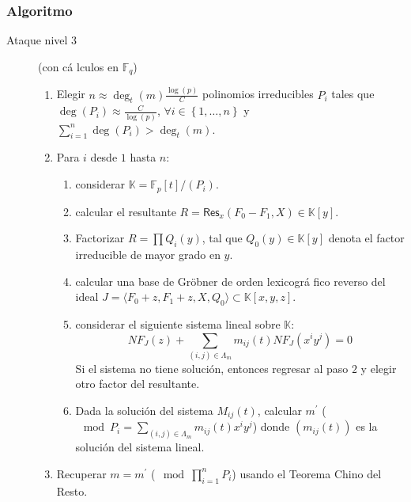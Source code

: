 \documentclass[11pt]{article}
\newcommand{\Fq}{\mathbb{F}_q}
\newcommand{\Fp}{\mathbb{F}_p}
\newcommand{\izq}{\left\{ }
\newcommand{\der}{\right\} }
\numberwithin{equation}{section} %
\numberwithin{figure}{section} %
\numberwithin{table}{section} %
\begin{document}
\newpage

			\subsubsection{Algoritmo}
			\label{421AlgFS}

				\begin{description}%
					\item[Ataque nivel 3] (con c\'a lculos en $\Fq$)%
					\begin{enumerate}%
						\item Elegir $n\approx \deg_t(m)\frac{\log(p)}{C}$ polinomios irreducibles $P_i$ tales que $\deg(P_i)\approx \frac{C}{\log(p)}$, $\forall i\in\izq 1,\ldots,n\der$ y $\sum_{i=1}^n \deg(P_i)>\deg_t(m)$.%
						\item Para $i$ desde $1$ hasta $n$:%
						\begin{enumerate}%
							\item considerar $\mathbb{K}=\Fp[t]/(P_i)$.%
							\item calcular el resultante $R=\mathsf{Res}_x(F_0-F_1,X)\in\mathbb{K}[y]$.%
							\item Factorizar $R=\prod Q_i(y)$, tal que $Q_0(y)\in\mathbb{K}[y]$ denota el factor irreducible de mayor grado en $y$.%
							\item calcular una base de Gröbner de orden lexicogr\'a fico reverso del ideal $J=\langle F_0+z,F_1+z,X,Q_0\rangle\subset\mathbb{K}[x,y,z]$.%
							\item considerar el siguiente sistema lineal sobre $\mathbb{K}$:%
								$$
									NF_J(z)+\sum_{(i,j)\in\Lambda_m}m_{ij}(t)NF_J(x^iy^j)=0
								$$
								Si el sistema no tiene soluci\'on, entonces regresar al paso $2$ y elegir otro factor del resultante.
							\item Dada la soluci\'on del sistema $M_{ij}(t)$, calcular $m^\prime$ ($\mod P_i=\sum_{(i,j)\in\Lambda_m}m_{ij}(t)x^iy^j$) donde $(m_{ij}(t))$ es la soluci\'on del sistema lineal.%
						\end{enumerate}%
						\item Recuperar $m=m^\prime$ ($\mod \prod_{i=1}^n P_i$) usando el Teorema Chino del Resto.%
					\end{enumerate}%
				\end{description}%
\end{document}
